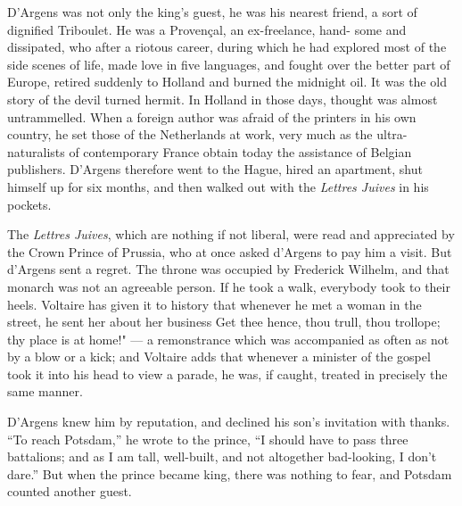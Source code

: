 \documentclass[]{book}
\begin{document}
D'Argens was not only the king's guest, he was his nearest friend, a
sort of dignified Triboulet. He was a Provençal, an ex-freelance, hand-
some and dissipated, who after a riotous career, during which he had
explored most of the side scenes of life, made love in five languages,
and fought over the better part of Europe, retired suddenly to Holland
and burned the midnight oil. It was the old story of the devil turned
hermit. In Holland in those days, thought was almost untrammelled. When
a foreign author was afraid of the printers in his own country, he set
those of the Netherlands at work, very much as the ultra-naturalists of
contemporary France obtain today the assistance of Belgian publishers.
D'Argens therefore went to the Hague, hired an apartment, shut himself
up for six months, and then walked out with the \emph{Lettres Juives} in
his pockets.

The \emph{Lettres Juives}, which are nothing if not liberal, were read
and appreciated by the Crown Prince of Prussia, who at once asked
d'Argens to pay him a visit. But d'Argens sent a regret. The throne was
occupied by Frederick Wilhelm, and that monarch was not an agreeable
person. If he took a walk, everybody took to their heels. Voltaire has
given it to history that whenever he met a woman in the street, he sent
her about her business Get thee hence, thou trull, thou trollope; thy
place is at home!" --- a remonstrance which was accompanied as often as
not by a blow or a kick; and Voltaire adds that whenever a minister of
the gospel took it into his head to view a parade, he was, if caught,
treated in precisely the same manner.

D'Argens knew him by reputation, and declined his son's invitation with
thanks. ``To reach Potsdam,'' he wrote to the prince, ``I should have to
pass three battalions; and as I am tall, well-built, and not altogether
bad-looking, I don't dare.'' But when the prince became king, there was
nothing to fear, and Potsdam counted another guest.
\end{document}
